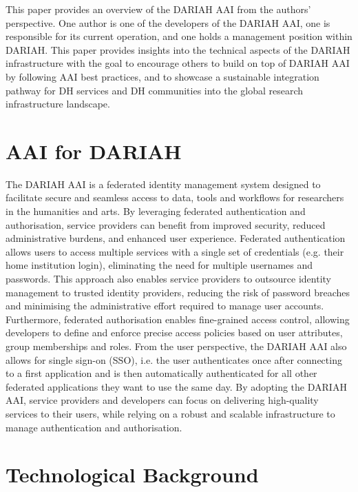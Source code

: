 \documentclass[final]{anthology-ch} %
\begin{document}
This paper provides an overview of the DARIAH AAI from the authors' perspective. One author is one of the developers of the DARIAH AAI, one is responsible for its current operation, and one holds a management position within DARIAH. This paper provides insights into the technical aspects of the DARIAH infrastructure with the goal to encourage others to build on top of DARIAH AAI by following AAI best practices, and to showcase a sustainable integration pathway for DH services and DH communities into the global research infrastructure landscape.


\section{AAI for DARIAH}

The DARIAH AAI \cite{web_dariahaai} is a federated identity management system designed to facilitate secure and seamless access to data, tools and workflows for researchers in the humanities and arts. By leveraging federated authentication and authorisation, service providers can benefit from improved security, reduced administrative burdens, and enhanced user experience. Federated authentication allows users to access multiple services with a single set of credentials (e.g. their home institution login), eliminating the need for multiple usernames and passwords. This approach also enables service providers to outsource identity management to trusted identity providers, reducing the risk of password breaches and minimising the administrative effort required to manage user accounts. Furthermore, federated authorisation enables fine-grained access control, allowing developers to define and enforce precise access policies based on user attributes, group memberships and roles. From the user perspective, the DARIAH AAI also allows for single sign-on (SSO), i.e. the user authenticates once after connecting to a first application and is then automatically authenticated for all other federated applications they want to use the same day. 
By adopting the DARIAH AAI, service providers and developers can focus on delivering high-quality services to their users, while relying on a robust and scalable infrastructure to manage authentication and authorisation.



\section{Technological Background}
\end{document}
